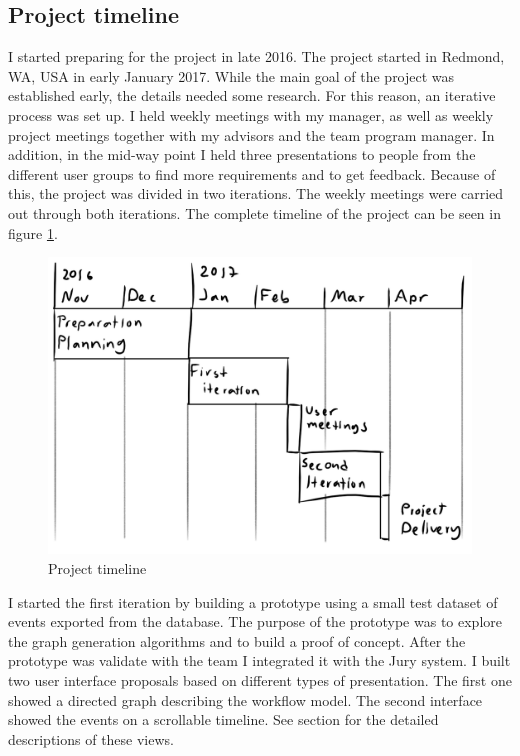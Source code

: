 \subsection{Project timeline}
\label{sec:timeline}
I started preparing for the project in late 2016.
The project started in Redmond, WA, USA in early January 2017.
While the main goal of the project was established early, the details needed some research. 
For this reason, an iterative process was set up.
I held weekly meetings with my manager, as well as weekly project meetings together with my advisors and the team program manager. 
In addition, in the mid-way point I held three presentations to people from the different user groups to find more requirements and to get feedback. Because of this, the project was divided in two iterations.
The weekly meetings were carried out through both iterations.
The complete timeline of the project can be seen in figure \ref{fig:projecttimeline}.

\begin{figure}[htb]
\centering \includegraphics[width=0.9\linewidth]{gfx/figures/projecttimeline.png}
\caption{Project timeline}
\label{fig:projecttimeline}
\end{figure}

I started the first iteration by building a prototype using a small test dataset of events exported from the database. The purpose of the prototype was to explore the graph generation algorithms and to build a proof of concept. After the prototype was validate with the team I integrated it with the Jury system. I built two user interface proposals based on different types of presentation. The first one showed a directed graph describing the workflow model. The second interface showed the events on a scrollable timeline.
See section  for the detailed descriptions of these views.

